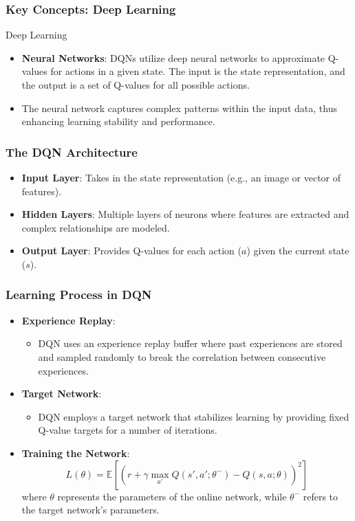 \documentclass[aspectratio=169]{beamer}
\begin{document}
\begin{frame}[fragile]
    \frametitle{Key Concepts: Deep Learning}
    \begin{block}{Deep Learning}
        \begin{itemize}
            \item \textbf{Neural Networks}: DQNs utilize deep neural networks to approximate Q-values for actions in a given state. 
            The input is the state representation, and the output is a set of Q-values for all possible actions.
            \item The neural network captures complex patterns within the input data, thus enhancing learning stability and performance.
        \end{itemize}
    \end{block}
\end{frame}

\begin{frame}[fragile]
    \frametitle{The DQN Architecture}
    \begin{itemize}
        \item \textbf{Input Layer}: Takes in the state representation (e.g., an image or vector of features).
        \item \textbf{Hidden Layers}: Multiple layers of neurons where features are extracted and complex relationships are modeled.
        \item \textbf{Output Layer}: Provides Q-values for each action ($a$) given the current state ($s$).
    \end{itemize}
\end{frame}

\begin{frame}[fragile]
    \frametitle{Learning Process in DQN}
    \begin{itemize}
        \item \textbf{Experience Replay}:
            \begin{itemize}
                \item DQN uses an experience replay buffer where past experiences are stored and sampled randomly to break the correlation between consecutive experiences.
            \end{itemize}
        \item \textbf{Target Network}:
            \begin{itemize}
                \item DQN employs a target network that stabilizes learning by providing fixed Q-value targets for a number of iterations.
            \end{itemize}
        \item \textbf{Training the Network}:
            \begin{equation}
                L(\theta) = \mathbb{E} \left[ (r + \gamma \max_{a'} Q(s', a'; \theta^{-}) - Q(s, a; \theta))^2 \right]
            \end{equation}
            where $\theta$ represents the parameters of the online network, while $\theta^{-}$ refers to the target network's parameters.
    \end{itemize}
\end{frame}
\end{document}
